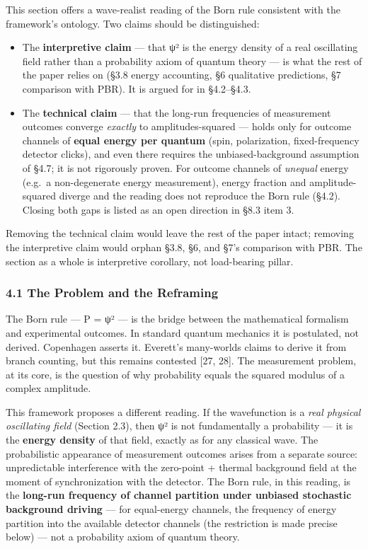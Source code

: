 \documentclass[
]{article}
\providecommand{\tightlist}{%
  \setlength{\itemsep}{0pt}\setlength{\parskip}{0pt}}
\begin{document}
This section offers a wave-realist reading of the Born rule consistent
with the framework's ontology. Two claims should be distinguished:

\begin{itemize}
\tightlist
\item
  The \textbf{interpretive claim} --- that \textbar ψ\textbar² is the
  energy density of a real oscillating field rather than a probability
  axiom of quantum theory --- is what the rest of the paper relies on
  (§3.8 energy accounting, §6 qualitative predictions, §7 comparison
  with PBR). It is argued for in §4.2--§4.3.
\item
  The \textbf{technical claim} --- that the long-run frequencies of
  measurement outcomes converge \emph{exactly} to amplitudes-squared ---
  holds only for outcome channels of \textbf{equal energy per quantum}
  (spin, polarization, fixed-frequency detector clicks), and even there
  requires the unbiased-background assumption of §4.7; it is not
  rigorously proven. For outcome channels of \emph{unequal} energy
  (e.g.~a non-degenerate energy measurement), energy fraction and
  amplitude-squared diverge and the reading does not reproduce the Born
  rule (§4.2). Closing both gaps is listed as an open direction in §8.3
  item 3.
\end{itemize}

Removing the technical claim would leave the rest of the paper intact;
removing the interpretive claim would orphan §3.8, §6, and §7's
comparison with PBR. The section as a whole is interpretive corollary,
not load-bearing pillar.

\subsubsection{4.1 The Problem and the
Reframing}\label{the-problem-and-the-reframing}

The Born rule --- P = \textbar ψ\textbar² --- is the bridge between the
mathematical formalism and experimental outcomes. In standard quantum
mechanics it is postulated, not derived. Copenhagen asserts it.
Everett's many-worlds claims to derive it from branch counting, but this
remains contested {[}27, 28{]}. The measurement problem, at its core, is
the question of why probability equals the squared modulus of a complex
amplitude.

This framework proposes a different reading. If the wavefunction is a
\emph{real physical oscillating field} (Section 2.3), then
\textbar ψ\textbar² is not fundamentally a probability --- it is the
\textbf{energy density} of that field, exactly as for any classical
wave. The probabilistic appearance of measurement outcomes arises from a
separate source: unpredictable interference with the zero-point +
thermal background field at the moment of synchronization with the
detector. The Born rule, in this reading, is the \textbf{long-run
frequency of channel partition under unbiased stochastic background
driving} --- for equal-energy channels, the frequency of energy
partition into the available detector channels (the restriction is made
precise below) --- not a probability axiom of quantum theory.
\end{document}
